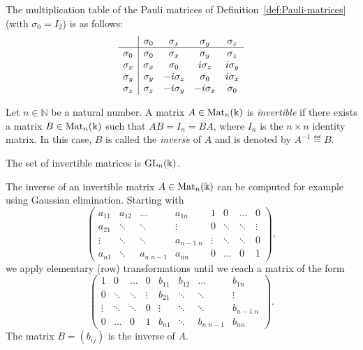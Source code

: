 \documentclass[a4paper, oneside, 12pt]{amsart}
\begin{document}
\begin{example}\label{ex:multiplication-table}
  The multiplication table of the Pauli matrices of Definition~\ref{def:Pauli-matrices} (with \(\sigma_{0}=I_{2}\)) is as follows:
  \begin{equation*}
    \begin{array}{l| c c c c}
      & \sigma_{0} & \sigma_{x} & \sigma_{y} & \sigma_{z} \\\hline
      \sigma_{0} & \sigma_{0} & \sigma_{x} & \sigma_{y} & \sigma_{z} \\
      \sigma_{x} & \sigma_{x} & \sigma_{0} & i \sigma_{z} & i\sigma_{y} \\
      \sigma_{y} & \sigma_{y} & -i \sigma_{z} & \sigma_{0} & i\sigma_{x} \\
      \sigma_{z} & \sigma_{z} & -i \sigma_{y} & - i\sigma_{x} & \sigma_{0}
    \end{array}
  \end{equation*}
\end{example}

\begin{definition}\label{def:invertible-matrix}
  Let \(n\in \mathbb{N}\) be a natural number.
  A matrix \( A \in \operatorname{Mat}_n(\Bbbk) \) is \emph{invertible} if there exists a matrix \( B \in \operatorname{Mat}_n(\Bbbk) \) such that \( AB = I_n = BA \), where \( I_n \) is the \( n \times n \) identity matrix.
  In this case, \( B \) is called the \emph{inverse} of \( A \) and is denoted by \( A^{-1} \eqdef B\).

  The set of invertible matrices is \(\operatorname{GL}_{n}( \Bbbk)\).
\end{definition}
The inverse of an invertible matrix \(A\in \operatorname{Mat}_{n}( \Bbbk)\) can be computed for example using Gaussian elimination.
Starting with
\begin{equation*}
  \left(\begin{array}{cccc|cccc}
    a_{11}& a_{12} & \dots & a_{1n}& 1 & 0 & \dots & 0 \\
    a_{21}& \ddots & \ddots & \vdots& 0 & \ddots &\ddots & \vdots \\
    \vdots& \ddots & \ddots & a_{n-1 \;n}& \vdots & \ddots & \ddots & 0 \\
    a_{n1}& \ddots & a_{n\; n-1} & a_{nn}& 0 & \dots & 0 & 1
  \end{array}\right),
\end{equation*}
we apply elementary (row) transformations until we reach a matrix of the form
\begin{equation*}
  \left(\begin{array}{cccc|cccc}
     1 & 0 & \dots & 0 & b_{11}& b_{12} & \dots & b_{1n} \\
     0 & \ddots & \ddots & \vdots & b_{21}& \ddots & \ddots & \vdots \\
    \vdots & \ddots & \ddots & 0 & \vdots& \ddots & \ddots & b_{n-1 \;n} \\
    0 & \dots & 0 & 1 & b_{n1}& \ddots & b_{n\; n-1} & b_{nn}
  \end{array}\right).
\end{equation*}
The matrix \(B=(b_{ij})\) is the inverse of \(A\).
\bigskip
\end{document}
